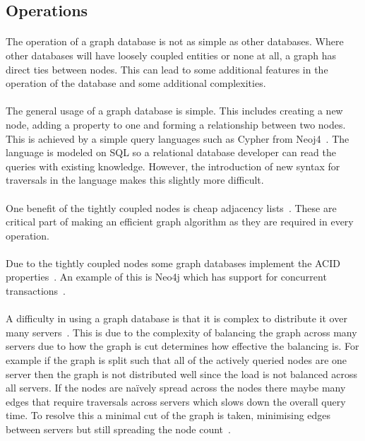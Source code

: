 \documentclass{CRPITStyle}
\renewcommand{\cite}{\citep}
\begin{document}
\subsection{Operations}

\paragraph{}
The operation of a graph database is not as simple as
other databases.
Where other databases will have loosely coupled entities
or none at all, a graph has direct ties between nodes.
This can lead to some additional features in the operation
of the database and some additional complexities.

\paragraph{}
The general usage of a graph database is simple.
This includes creating a new node, adding a property to one
and forming a relationship between two nodes.
This is achieved by a simple query languages such
as Cypher from Neoj4~\cite{neo4j}.
The language is modeled on SQL so a relational database
developer can read the queries with existing knowledge.
However, the introduction of new syntax for traversals
in the language makes this slightly more difficult.

\paragraph{}
One benefit of the tightly coupled nodes is cheap
adjacency lists~\cite{type_nosql}.
These are critical part of making an efficient graph
algorithm as they are required in every operation.

\paragraph{}
Due to the tightly coupled nodes some graph databases
implement the ACID properties~\cite{type_nosql,neo4j}.
An example of this is Neo4j which has support for
concurrent transactions~\cite{neo4j}.

\paragraph{}
A difficulty in using a graph database is that it is complex
to distribute it over many servers~\cite{sql_nosql}.
This is due to the complexity of balancing the
graph across many servers due to how the graph is
cut determines how effective the balancing is.
For example if the graph is split such that all of the
actively queried nodes are one server then the graph is
not distributed well since the load is not balanced across
all servers. If the nodes are naïvely spread across the nodes
there maybe many edges that require traversals across servers
which slows down the overall query time.
To resolve this a minimal cut of the graph is taken, minimising edges
between servers but still spreading the node count~\cite{neo4j}.
\end{document}
